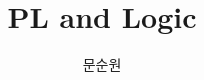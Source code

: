 \documentclass{beamer}
\title{PL and Logic}
\author{문순원}
\begin{document}
\begin{frame}
  \titlepage
\end{frame}
\end{document}
